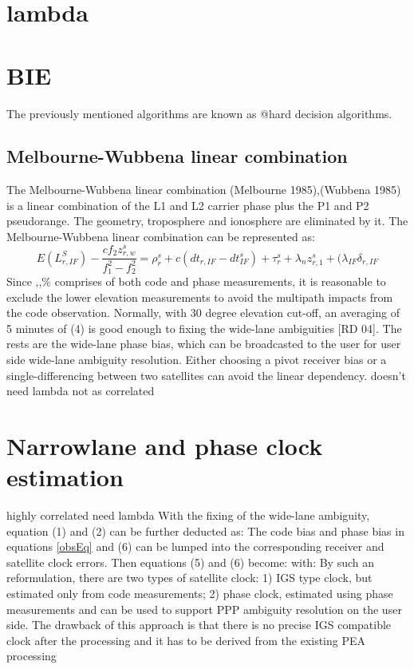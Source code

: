 \section{lambda}
\section{BIE}
The previously mentioned algorithms are known as @hard decision algorithms.

\subsection{Melbourne-Wubbena linear combination}
The Melbourne-Wubbena linear combination (Melbourne 1985),(Wubbena 1985) is a linear combination of the L1 and L2 carrier phase plus the P1 and P2 pseudorange. The geometry, troposphere and ionosphere are eliminated by it. The Melbourne-Wubbena linear combination can be represented as:
%
\begin{equation}
E(L_{r,IF}^S) - \frac{cf_2z_{r,w}^s}{f_1^2 - f_2^2} = \rho_r^s + c(dt_{r,IF} - dt_{IF}^s) + \tau_r^s + \lambda_n z_{r,1}^s + (\lambda_{IF}\delta_{r,IF}
\end{equation}
%
Since ,,\% comprises of both code and phase measurements, it is reasonable to exclude the lower
elevation measurements to avoid the multipath impacts from the code observation. Normally, with
30 degree elevation cut-off, an averaging of 5 minutes of (4) is good enough to fixing the wide-lane
ambiguities [RD 04]. The rests are the wide-lane phase bias, which can be broadcasted to the user for
user side wide-lane ambiguity resolution. Either choosing a pivot receiver bias or a single-differencing
between two satellites can avoid the linear dependency. 
%
%
doesn't need lambda not as correlated
%
\section{Narrowlane and phase clock estimation}
%
highly correlated need lambda
%
%
With the fixing of the wide-lane ambiguity, equation (1) and (2) can be further deducted as:
%
The code bias and phase bias in equations \eqref{obsEq} and (6) can be lumped into the corresponding receiver
and satellite clock errors. Then equations (5) and (6) become:
%
with:
%
By such an reformulation, there are two types of satellite clock: 1) IGS type clock, but estimated only
from code measurements; 2) phase clock, estimated using phase measurements and can be used to
support PPP ambiguity resolution on the user side. The drawback of this approach is that there is no
precise IGS compatible clock after the processing and it has to be derived from the existing PEA
processing
%
